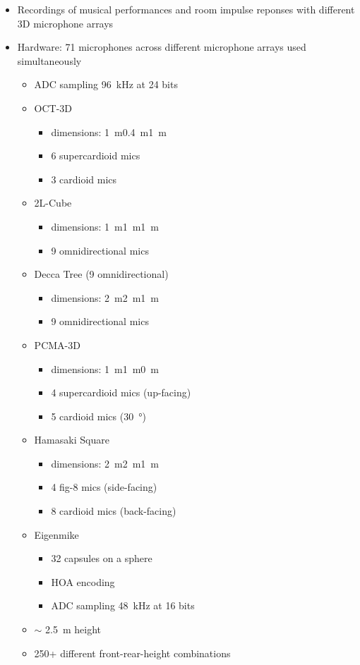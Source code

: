 \documentclass[14pt, legalpaper]{extarticle}
\begin{document}
\begin{itemize}

\item Recordings of musical performances and room impulse reponses with different 3D microphone arrays \cite{lee3d}

\item Hardware: 71 microphones across different microphone arrays used simultaneously
	\begin{itemize}
	\item ADC sampling \SI{96}{\kilo\hertz} at 24 bits
	\item OCT-3D \cite{theile20123d}
		\begin{itemize}
		\item dimensions: \SI{1}{\metre}\texttimes\SI{0.4}{\metre}\texttimes\SI{1}{\metre}
		\item 6 supercardioid mics
		\item 3 cardioid mics
		\end{itemize}
	\item 2L-Cube 
		\begin{itemize}
		\item dimensions: \SI{1}{\metre}\texttimes\SI{1}{\metre}\texttimes\SI{1}{\metre}
		\item 9 omnidirectional mics
		\end{itemize}
	\item Decca Tree (9 omnidirectional)
		\begin{itemize}
		\item dimensions: \SI{2}{\metre}\texttimes\SI{2}{\metre}\texttimes\SI{1}{\metre}
		\item 9 omnidirectional mics
		\end{itemize}
	\item PCMA-3D \cite{lee2014effect}
		\begin{itemize}
		\item dimensions: \SI{1}{\metre}\texttimes\SI{1}{\metre}\texttimes\SI{0}{\metre}
		\item 4 supercardioid mics (up-facing)
		\item 5 cardioid mics (\SI{30}{\degree})
		\end{itemize}
	\item Hamasaki Square
		\begin{itemize}
		\item dimensions: \SI{2}{\metre}\texttimes\SI{2}{\metre}\texttimes\SI{1}{\metre}
		\item 4 fig-8 mics (side-facing)
		\item 8 cardioid mics (back-facing)
		\end{itemize}
	\item Eigenmike
		\begin{itemize}
		\item 32 capsules on a sphere
		\item HOA encoding
		\item ADC sampling \SI{48}{\kilo\hertz} at 16 bits
		\end{itemize}
	\item $\sim$ \SI{2.5}{\metre} height
	\item 250+ different front-rear-height combinations
	\end{itemize}


\end{itemize}
\end{document}
